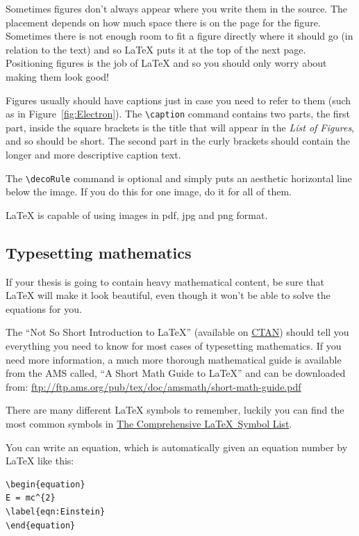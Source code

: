 \documentclass[
12pt, %
english, %
doublespacing, %
nolistspacing, %
liststotoc, %
headsepline, %
chapterinoneline, %
openany, %
]{DoctoralThesis}\usepackage[]{graphicx}\usepackage[]{color}
\begin{document}
Sometimes figures don't always appear where you write them in the source. The placement depends on how much space there is on the page for the figure. Sometimes there is not enough room to fit a figure directly where it should go (in relation to the text) and so \LaTeX{} puts it at the top of the next page. Positioning figures is the job of \LaTeX{} and so you should only worry about making them look good!

Figures usually should have captions just in case you need to refer to them (such as in Figure~\ref{fig:Electron}). The \verb|\caption| command contains two parts, the first part, inside the square brackets is the title that will appear in the \emph{List of Figures}, and so should be short. The second part in the curly brackets should contain the longer and more descriptive caption text.

The \verb|\decoRule| command is optional and simply puts an aesthetic horizontal line below the image. If you do this for one image, do it for all of them.

\LaTeX{} is capable of using images in pdf, jpg and png format.

\subsection{Typesetting mathematics}

If your thesis is going to contain heavy mathematical content, be sure that \LaTeX{} will make it look beautiful, even though it won't be able to solve the equations for you.

The \enquote{Not So Short Introduction to \LaTeX} (available on \href{http://www.ctan.org/tex-archive/info/lshort/english/lshort.pdf}{CTAN}) should tell you everything you need to know for most cases of typesetting mathematics. If you need more information, a much more thorough mathematical guide is available from the AMS called, \enquote{A Short Math Guide to \LaTeX} and can be downloaded from:
\url{ftp://ftp.ams.org/pub/tex/doc/amsmath/short-math-guide.pdf}

There are many different \LaTeX{} symbols to remember, luckily you can find the most common symbols in \href{http://ctan.org/pkg/comprehensive}{The Comprehensive \LaTeX~Symbol List}.

You can write an equation, which is automatically given an equation number by \LaTeX{} like this:
\begin{verbatim}
\begin{equation}
E = mc^{2}
\label{eqn:Einstein}
\end{equation}
\end{verbatim}
\end{document}
